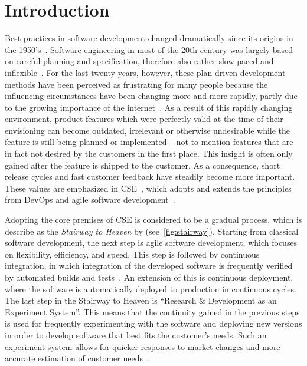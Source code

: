 %
\chapter{Introduction}
\label{ch:intro}





Best practices in software development changed dramatically since its origins in the 1950's~\cite{boehm2006view}.
Software engineering in most of the 20th century was largely based on careful planning and specification, therefore also rather slow-paced and inflexible~\cite{boehm2006view}.
For the last twenty years, however, these plan-driven development methods have been perceived as frustrating for many people because the influencing circumstances have been changing more and more rapidly, partly due to the growing importance of the internet~\cite{Williams2003}.
As a result of this rapidly changing environment, product features which were perfectly valid at the time of their envisioning can become outdated, irrelevant or otherwise undesirable while the feature is still being planned or implemented -- not to mention features that are in fact not desired by the customers in the first place.
This insight is often only gained after the feature is shipped to the customer.
As a consequence, short release cycles and fast customer feedback have steadily become more important.
These values are emphasized in \acf{CSE}~\cite{Bosch2014}, which adopts and extends the principles from DevOps and agile software development~\cite{Fitzgerald2017,fowler2001agile}.

Adopting the core premises of \ac{CSE} is considered to be a gradual process, which is describe as the \emph{Stairway to Heaven} by \citet{Olsson2012} (see~\cref{fig:stairway}).
Starting from classical software development, the next step is agile software development, which focuses on flexibility, efficiency, and speed.
This step is followed by continuous integration, in which integration of the developed software is frequently verified by automated builds and tests~\cite[Maintaining Model Integrity, pp.~341~ff.]{evans2004domain}.
An extension of this is continuous deployment, where the software is automatically deployed to production in continuous cycles.
The last step in the Stairway to Heaven is ``Research \& Development as an Experiment System''.
This means that the continuity gained in the previous steps is used for frequently experimenting with the software and deploying new versions in order to develop software that best fits the customer's needs.
Such an experiment system allows for quicker responses to market changes and more accurate estimation of customer needs~\cite{Olsson2012}.

